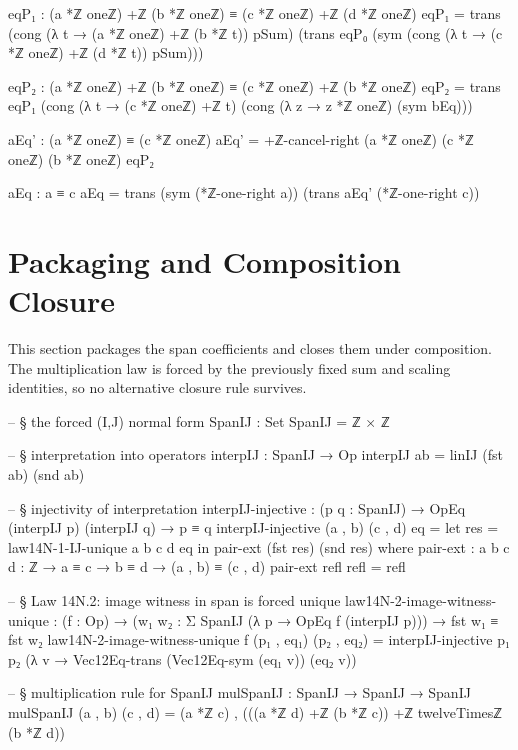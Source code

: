 \documentclass[11pt,a4paper]{book}
\begin{document}
\begin{code}
    eqP₁ : (a *ℤ oneℤ) +ℤ (b *ℤ oneℤ) ≡ (c *ℤ oneℤ) +ℤ (d *ℤ oneℤ)
    eqP₁ =
      trans (cong (λ t → (a *ℤ oneℤ) +ℤ (b *ℤ t)) pSum)
        (trans eqP₀ (sym (cong (λ t → (c *ℤ oneℤ) +ℤ (d *ℤ t)) pSum)))

    eqP₂ : (a *ℤ oneℤ) +ℤ (b *ℤ oneℤ) ≡ (c *ℤ oneℤ) +ℤ (b *ℤ oneℤ)
    eqP₂ =
      trans
        eqP₁
        (cong (λ t → (c *ℤ oneℤ) +ℤ t)
          (cong (λ z → z *ℤ oneℤ) (sym bEq)))

    aEq' : (a *ℤ oneℤ) ≡ (c *ℤ oneℤ)
    aEq' = +ℤ-cancel-right (a *ℤ oneℤ) (c *ℤ oneℤ) (b *ℤ oneℤ) eqP₂

    aEq : a ≡ c
    aEq =
      trans (sym (*ℤ-one-right a))
        (trans aEq' (*ℤ-one-right c))
\end{code}

\section{Packaging and Composition Closure}

This section packages the span coefficients and closes them under composition.
The multiplication law is forced by the previously fixed sum and scaling
identities, so no alternative closure rule survives.

\begin{code}
-- § the forced (I,J) normal form
SpanIJ : Set
SpanIJ = ℤ × ℤ

-- § interpretation into operators
interpIJ : SpanIJ → Op
interpIJ ab = linIJ (fst ab) (snd ab)

-- § injectivity of interpretation
interpIJ-injective : (p q : SpanIJ) → OpEq (interpIJ p) (interpIJ q) → p ≡ q
interpIJ-injective (a , b) (c , d) eq =
  let res = law14N-1-IJ-unique a b c d eq in
  pair-ext (fst res) (snd res)
  where
    pair-ext : {a b c d : ℤ} → a ≡ c → b ≡ d → (a , b) ≡ (c , d)
    pair-ext refl refl = refl

-- § Law 14N.2: image witness in span is forced unique
law14N-2-image-witness-unique :
  (f : Op) →
  (w₁ w₂ : Σ SpanIJ (λ p → OpEq f (interpIJ p))) →
  fst w₁ ≡ fst w₂
law14N-2-image-witness-unique f (p₁ , eq₁) (p₂ , eq₂) =
  interpIJ-injective p₁ p₂ (λ v → Vec12Eq-trans (Vec12Eq-sym (eq₁ v)) (eq₂ v))

-- § multiplication rule for SpanIJ
mulSpanIJ : SpanIJ → SpanIJ → SpanIJ
mulSpanIJ (a , b) (c , d) = (a *ℤ c) , (((a *ℤ d) +ℤ (b *ℤ c)) +ℤ twelveTimesℤ (b *ℤ d))
\end{code}
\end{document}

